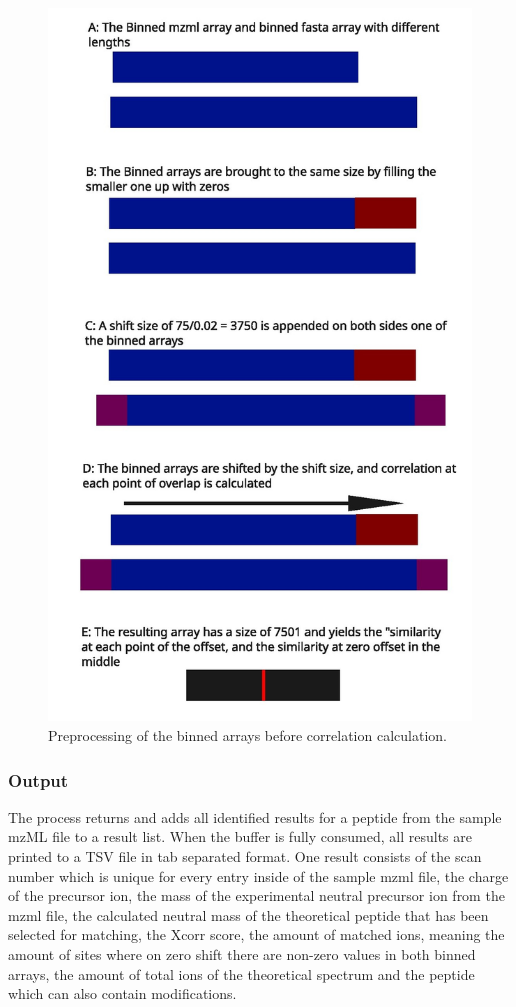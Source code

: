 \documentclass[11pt]{article}
\begin{document}
\begin{figure}
\includegraphics[width=\linewidth]{figs/crosscorr.jpg} 
\caption{Preprocessing of the binned arrays before correlation calculation.}
\label{fig:corr}
\end{figure}
\subsubsection{Output}
The process returns and adds all identified results for a peptide from the sample mzML file to a result list. When the buffer is fully consumed, all results are printed to a TSV file in tab separated format. One result consists of the scan number which is unique for every entry inside of the sample mzml file, the charge of the precursor ion, the mass of the experimental neutral precursor ion from the mzml file, the calculated neutral mass of the theoretical peptide that has been selected for matching, the Xcorr score, the amount of matched ions, meaning the amount of sites where on zero shift there are non-zero values in both binned arrays, the amount of total ions of the theoretical spectrum and the peptide which can also contain modifications.
\end{document}
